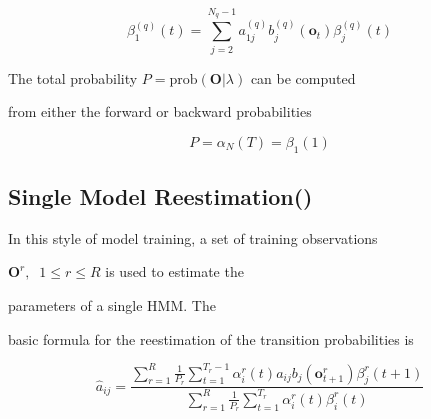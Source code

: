 \[


   \beta^{(q)}_{1}(t) = 


        \sum_{j=2}^{N_q-1} a^{(q)}_{1j} b^{(q)}_j(\bm{o}_t) 


                          \beta^{(q)}_{j}(t) 


\]














The total probability $P = \mbox{prob}(\bm{O} | \lambda)$ can be computed


from either the forward or backward probabilities


\[


P = \alpha_N(T) = \beta_1(1)


\]





\subsection{Single Model Reestimation()}







In this style of model training, a set of training observations


$\bm{O}^r, \;\; 1 \leq r \leq R$ is used to estimate the 


parameters of a single HMM. The


basic formula for the reestimation of the transition probabilities is


\newcommand{\albe}[1]{


                  \sum_{r=1}^R \frac{1}{P_r}


                  \sum_{t=1}^{T_r}


                  \alpha^r_#1(t)\beta^r_#1(t)


}


\[


   \hat{a}_{ij} = \frac{


                  \sum_{r=1}^R \frac{1}{P_r}


                  \sum_{t=1}^{T_r-1}


                  \alpha^r_i(t)a_{ij}b_j(\bm{o}^r_{t+1})\beta^r_j(t+1)


                    }{\albe{i}}


\]


